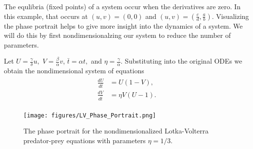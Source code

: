 The equlibria (fixed points) of a system occur when the derivatives are zero.
In this example, that occurs at $(u,v)=(0,0)$ and $(u,v)=(\frac{c}{d},\frac{a}{b})$.
Visualizing the phase portrait helps to give more insight into the dynamics of a system. We will do this by first nondimensionalzing our system to reduce the number of parameters.

Let $U = \frac{\gamma}{\delta}u,$ $V = \frac{\beta}{\alpha}v$, $\bar{t} = \alpha t,$ and $\eta = \frac{\gamma}{\alpha}$.
Substituting into the original ODEs we obtain the nondimensional system of equations
\begin{align}
	\begin{split}
	\frac{dU}{d\bar{t}} &= U(1-V),\\
	\frac{dV}{d\bar{t}} &= \eta V (U-1).
	\end{split}\label{lotka_volterra}
\end{align}
\begin{figure}
\centering
\texttt{[image: figures/LV\_Phase\_Portrait.png]}
\caption{The phase portrait for the nondimensionalized Lotka-Volterra predator-prey equations with parameters $\eta = 1/3$.
 }
\label{fig: lotka-phase}
\end{figure}




